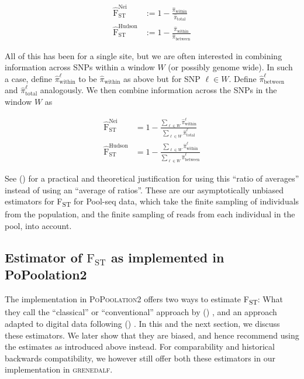 \documentclass[letterpaper,fontsize=9pt,DIV=12]{scrartcl}
\newcommand\citeay[1]{\citeauthor{#1} (\citeyear{#1}) \cite{#1}}
\newcommand\toolname{\textsc}
\newcommand{\fst}{F\textsubscript{ST}}
\begin{document}
\begin{align}
    \widehat{\text{F}}_\text{ST}^\text{Nei} &:= 1 - \frac{\widehat{\pi}_\text{within}}{\widehat{\pi}_\text{total}}\\
    \widehat{\text{F}}_\text{ST}^\text{Hudson} &:= 1 - \frac{\widehat{\pi}_\text{within}}{\widehat{\pi}_\text{between}}
\end{align}

All of this has been for a single site, but we are often interested in combining information across SNPs within a window $W$ (or possibly genome wide).
In such a case, define $\widehat{\pi}^\ell_\text{within}$ to be $\widehat{\pi}_\text{within}$ as above but for SNP $\ell \in W$.
Define $\widehat{\pi}^\ell_\text{between}$ and $\widehat{\pi}^\ell_\text{total}$ analogously.
We then combine information across the SNPs in the window $W$ as

\begin{align}
    \widehat{\text{F}}_\text{ST}^\text{Nei}    &= 1 - \frac{\sum_{\ell \in W} \widehat{\pi}^\ell_\text{within}} {\sum_{\ell \in W} \widehat{\pi}^\ell_\text{total}} \\
    \widehat{\text{F}}_\text{ST}^\text{Hudson} &= 1 - \frac{\sum_{\ell \in W} \widehat{\pi}^\ell_\text{within}} {\sum_{\ell \in W} \widehat{\pi}^\ell_\text{between}}
\end{align}

See \citeay{Bhatia2013} for a practical and theoretical justification for using this ``ratio of averages'' instead of using an ``average of ratios''.
These are our asymptotically unbiased estimators for \fst{} for Pool-seq data, which take the finite sampling of individuals from the population, and the finite sampling of reads from each individual in the pool, into account.


\subsection{Estimator of \texorpdfstring{$\text{F}_\text{ST}$}{FST} as implemented in PoPoolation2}
\label{supp:sec:FST:sub:PoPoolation2Estimator}

The implementation in \toolname{PoPoolation2} \cite{Kofler2011b} offers two ways to estimate \fst{}:
What they call the ``classical'' or ``conventional'' approach by \citeay{Hartl2007}, and an approach adapted to digital data following \citeay{Karlsson2007}.
In this and the next section, we discuss these estimators.
We later show that they are biased, and hence recommend using the estimates as introduced above instead.
For comparability and historical backwards compatibility, we however still offer both these estimators in our implementation in \toolname{grenedalf}.
\end{document}
